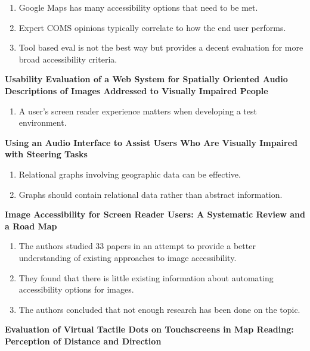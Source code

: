 \documentclass{article}
\begin{document}
\begin{enumerate}
    \item Google Maps has many accessibility options that need to be met. 
    \item Expert COMS opinions typically correlate to how the end user performs. 
    \item Tool based eval is not the best way but provides a decent evaluation for more broad accessibility criteria. 
\end{enumerate}
\cite{10.1007/978-3-319-07440-5_15} \textbf{Usability Evaluation of a Web System for Spatially Oriented Audio Descriptions of Images Addressed to Visually Impaired People } 

\begin{enumerate}
    \item A user's screen reader experience matters when developing a test environment.
\end{enumerate}

\cite{10.1145/1168987.1169008} \textbf{Using an Audio Interface to Assist Users Who Are Visually Impaired with Steering Tasks }

\begin{enumerate}
    \item Relational graphs involving geographic data can be effective. 
    \item Graphs should contain relational data rather than abstract information. 
\end{enumerate}

\cite{electronics10080953}\textbf{Image Accessibility for Screen Reader Users: A Systematic Review and a Road Map }

\begin{enumerate}
    \item The authors studied 33 papers in an attempt to provide a better understanding of existing approaches to image accessibility.
    \item They found that there is little existing information about automating accessibility options for images.
    \item The authors concluded that not enough research has been done on the topic.
\end{enumerate}

\cite{watanabe2017evaluation}\textbf{Evaluation of Virtual Tactile Dots on Touchscreens in Map Reading: Perception of Distance and Direction }
\end{document}
